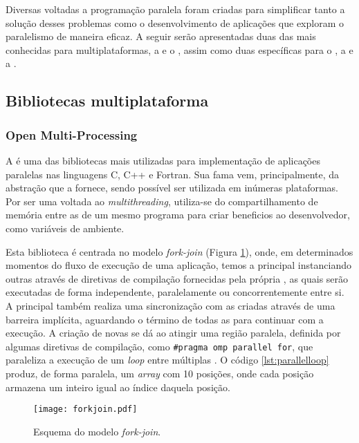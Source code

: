 Diversas \APIs voltadas a programação paralela foram criadas para simplificar tanto a solução desses problemas como o desenvolvimento de aplicações que exploram o paralelismo de maneira eficaz. A seguir serão apresentadas duas das mais conhecidas \APIs para multiplataformas, a \textit{\OpenMP} e o \textit{\MPI}, assim como duas \APIs específicas para o \mppa, a \ASYNC e a \IPC.

\subsection{Bibliotecas multiplataforma}
\label{sec:bibliotecasmultiplataforma}

\subsubsection{Open Multi-Processing}
\label{sec:openmp}

A \OpenMP é uma das bibliotecas mais utilizadas para implementação de aplicações paralelas nas linguagens C, C++ e Fortran. Sua fama vem, principalmente, da abstração que a \API fornece, sendo possível ser utilizada em inúmeras plataformas. Por ser uma \API voltada ao \textit{multithreading}, utiliza-se do compartilhamento de memória entre as \threads de um mesmo programa para criar beneficios ao desenvolvedor, como variáveis de ambiente.

Esta biblioteca é centrada no modelo \textit{fork-join} (Figura \ref{fig:forkjoin}), onde, em determinados momentos do fluxo de execução de uma aplicação, temos a \thread principal instanciando outras \threads através de diretivas de compilação fornecidas pela própria \API, as quais serão executadas de forma independente, paralelamente ou concorrentemente entre si. A \thread principal também realiza uma sincronização com as \threads criadas através de uma barreira implícita, aguardando o término de todas as \threads para continuar com a execução. A criação de novas \threads se dá ao atingir uma região paralela, definida por algumas diretivas de compilação, como \texttt{\#pragma omp parallel for}, que paraleliza a execução de um \textit{loop} entre múltiplas \threads. O código \ref{lst:parallelloop} produz, de forma paralela, um \textit{array} com 10 posições, onde cada posição armazena um inteiro igual ao índice daquela posição.


\begin{figure}[tb]
  \centering
  \caption{Esquema do modelo \textit{fork-join}.}
  \label{fig:forkjoin}
  \texttt{[image: forkjoin.pdf]}
\end{figure}


